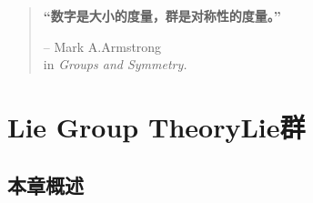 

\begin{quote}
{\bf “数字是大小的度量，群是对称性的度量。”}


\begin{flushright}
-- Mark A.Armstrong\\
in {\it Groups and Symmetry.}
\end{flushright}
\end{quote}

\chapter[Lie群]{Lie Group Theory\quad  Lie群}
\label{chap3}

\section*{本章概述}



